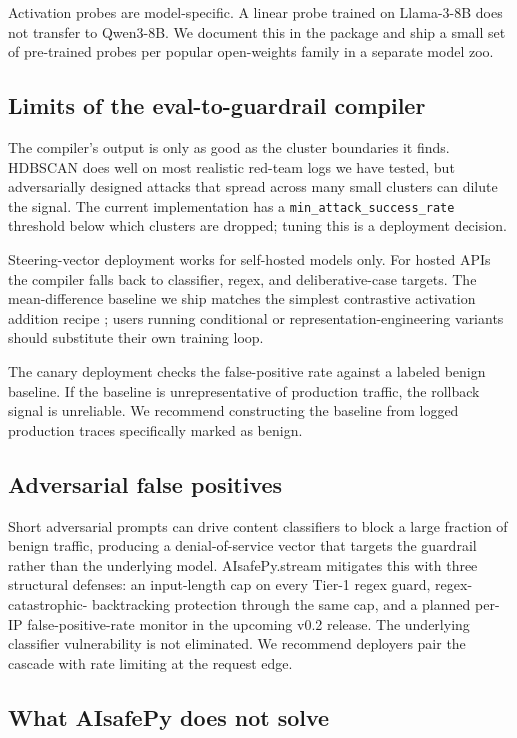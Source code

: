 Activation probes are model-specific. A linear probe trained on
Llama-3-8B does not transfer to Qwen3-8B. We document this in the
package and ship a small set of pre-trained probes per popular
open-weights family in a separate model zoo.

\subsection{Limits of the eval-to-guardrail compiler}

The compiler's output is only as good as the cluster boundaries it
finds. HDBSCAN does well on most realistic red-team logs we have
tested, but adversarially designed attacks that spread across many
small clusters can dilute the signal. The current implementation
has a \texttt{min\_attack\_success\_rate} threshold below which
clusters are dropped; tuning this is a deployment decision.

Steering-vector deployment works for self-hosted models only. For
hosted APIs the compiler falls back to classifier, regex, and
deliberative-case targets. The mean-difference baseline we ship
matches the simplest contrastive activation addition recipe
\citep{panickssery2023cad}; users running conditional or
representation-engineering variants should substitute their own
training loop.

The canary deployment checks the false-positive rate against a
labeled benign baseline. If the baseline is unrepresentative of
production traffic, the rollback signal is unreliable. We recommend
constructing the baseline from logged production traces specifically
marked as benign.

\subsection{Adversarial false positives}

Short adversarial prompts can drive content classifiers to block a
large fraction of benign traffic, producing a denial-of-service
vector that targets the guardrail rather than the underlying model.
AIsafePy.stream mitigates this with three structural defenses: an
input-length cap on every Tier-1 regex guard, regex-catastrophic-
backtracking protection through the same cap, and a planned per-IP
false-positive-rate monitor in the upcoming v0.2 release. The
underlying classifier vulnerability is not eliminated. We recommend
deployers pair the cascade with rate limiting at the request edge.

\subsection{What AIsafePy does not solve}

